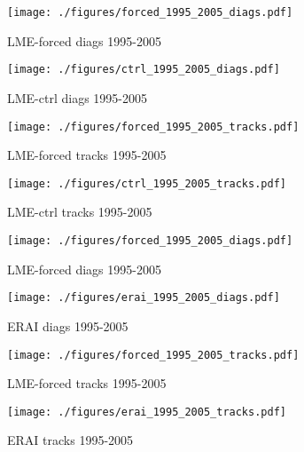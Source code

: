 \begin{figure}[!tbp]
\centering
\begin{minipage}[b]{0.45\textwidth}
\texttt{[image: ./figures/forced\_1995\_2005\_diags.pdf]}
\caption{LME-forced diags 1995-2005}
\end{minipage}
\hfill
\begin{minipage}[b]{0.45\textwidth}
\texttt{[image: ./figures/ctrl\_1995\_2005\_diags.pdf]}
\caption{LME-ctrl diags 1995-2005}
\end{minipage}
\end{figure}

\begin{figure}[!tbp]
\centering
\begin{minipage}[b]{0.45\textwidth}
\texttt{[image: ./figures/forced\_1995\_2005\_tracks.pdf]}
\caption{LME-forced tracks 1995-2005}
\end{minipage}
\hfill
\begin{minipage}[b]{0.45\textwidth}
\texttt{[image: ./figures/ctrl\_1995\_2005\_tracks.pdf]}
\caption{LME-ctrl tracks 1995-2005}
\end{minipage}
\end{figure}

\begin{figure}[!tbp]
\centering
\begin{minipage}[b]{0.45\textwidth}
\texttt{[image: ./figures/forced\_1995\_2005\_diags.pdf]}
\caption{LME-forced diags 1995-2005}
\end{minipage}
\hfill
\begin{minipage}[b]{0.45\textwidth}
\texttt{[image: ./figures/erai\_1995\_2005\_diags.pdf]}
\caption{ERAI diags 1995-2005}
\end{minipage}
\end{figure}

\begin{figure}[!tbp]
\centering
\begin{minipage}[b]{0.45\textwidth}
\texttt{[image: ./figures/forced\_1995\_2005\_tracks.pdf]}
\caption{LME-forced tracks 1995-2005}
\end{minipage}
\hfill
\begin{minipage}[b]{0.45\textwidth}
\texttt{[image: ./figures/erai\_1995\_2005\_tracks.pdf]}
\caption{ERAI tracks 1995-2005}
\end{minipage}
\end{figure}

